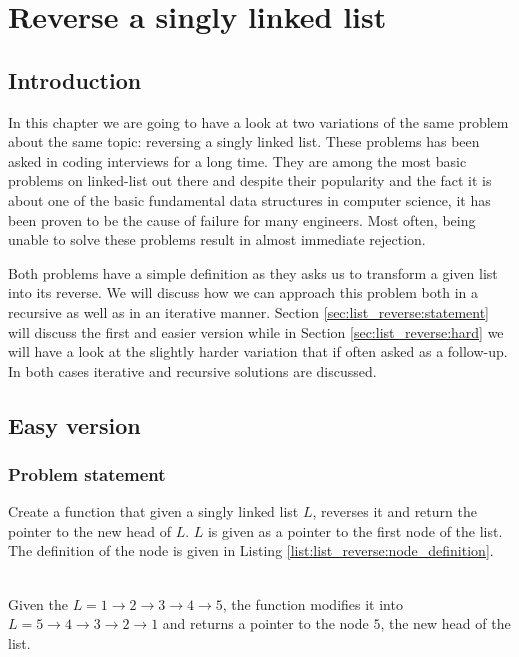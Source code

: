 %

\chapter{Reverse a singly linked list}
\label{ch:list_reverse}

\section*{Introduction}
In this chapter we are going to have a look at two variations of the same problem about the same topic: reversing a singly
linked list. These problems has been asked in coding interviews for a long time. They are among the most
basic problems on linked-list out there and despite their popularity and the fact it is about one of
the basic fundamental data structures in computer science, it has been proven to be the cause of
failure for many engineers. Most often, being unable to solve these problems result in almost
immediate rejection.

Both problems have a simple definition as they asks us to transform a given list into its reverse. We
will discuss how we can approach this problem both in a recursive as well as in an iterative manner.
Section \ref{sec:list_reverse:statement} will discuss the first and easier version while in Section \ref{sec:list_reverse:hard} 
we will have a look at the slightly harder variation that if often asked as a follow-up.
In both cases iterative and recursive solutions are discussed.

\section{Easy version}
\label{sec:list_reverse:statementeasy}
\subsection{Problem statement}
\begin{exercise}
Create a function that given a singly linked list $L$, reverses it and return the pointer to the new head of $L$.
$L$ is given as a pointer to the first node of the list. The definition of the node is given in Listing \ref{list:list_reverse:node_definition}.



\begin{example}
	\hfill \\
	Given the $L = 1 \rightarrow 2 \rightarrow 3 \rightarrow 4 \rightarrow 5$, the function modifies it into 
	$L = 5 \rightarrow 4 \rightarrow 3 \rightarrow 2 \rightarrow 1$ and returns a pointer to the node $5$, the new head of the list.
\end{example}

\end{exercise}

